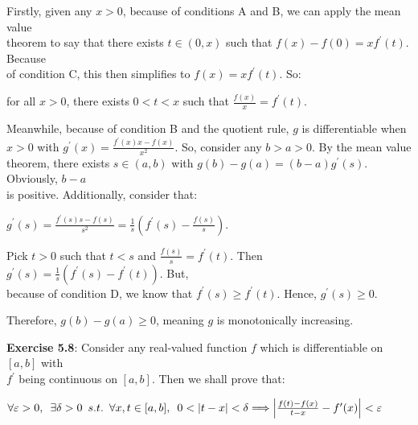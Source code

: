 \documentclass{book}
\newcommand{\pracTwo}{
   \color{Orange}%
   \fontsize{12}{14}\selectfont%
}
\newenvironment{myIndent}{%
   \begin{adjustwidth}{2.5em}{0em}%
}{%
   \end{adjustwidth}%
}
\newcommand{\suchthat}{ \hspace{0.5em}s.t.\hspace{0.5em}}
\newcommand{\myHS}{ \hspace{0.5em}}
\newcommand{\retTwo}{\hfill\bigbreak}
\begin{document}
{\begin{myIndent}\pracTwo
   Firstly, given any $x > 0$, because of conditions A and B, we can apply the mean value\\ theorem to say that there exists $t \in (0, x)$ such that $f(x) - f(0) = xf^\prime(t)$. Because\\ of condition C, this then simplifies to $f(x) = xf^\prime(t)$. So:
   \begin{center}
      for all $x > 0$, there exists $0 < t < x$ such that $\frac{f(x)}{x} = f^\prime(t)$.\retTwo
   \end{center}

   Meanwhile, because of condition B and the quotient rule, $g$ is differentiable when\\ $x > 0$ with $g^\prime(x) = \frac{f^\prime(x)x - f(x)}{x^2}$. So, consider any $b > a > 0$. By the mean value\\ theorem, there exists $s \in (a, b)$ with $g(b) - g(a) = (b - a)g^\prime(s)$. Obviously, $b - a$\\ [1pt] is positive. Additionally, consider that:
   
   {\center$g^\prime(s) = \frac{f^\prime(s)s - f(s)}{s^2} = \frac{1}{s}\left(f^\prime(s) - \frac{f(s)}{s}\right)$.\retTwo\par}

   Pick $t > 0$ such that $t < s$ and $\frac{f(s)}{s} = f^\prime(t)$. Then $g^\prime(s) = \frac{1}{s}\left(f^\prime(s) - f^\prime(t)\right)$. But,\\ because of condition D, we know that $f^\prime(s) \geq f^\prime(t)$. Hence, $g^\prime(s) \geq 0$.\retTwo

   Therefore, $g(b) - g(a) \geq 0$, meaning $g$ is monotonically increasing.
\end{myIndent}}

\newpage

\textbf{Exercise 5.8}: Consider any real-valued function $f$ which is differentiable on $[a, b]$ with\\ $f^\prime$ being continuous on $[a, b]$. Then we shall prove that:

{\centering $\forall \varepsilon > 0,\myHS \exists \delta > 0\suchthat\forall x, t \in [a, b],\myHS 0 < |t - x| < \delta \Longrightarrow \left|\frac{f(t) - f(x)}{t - x} - f^\prime(x)\right| < \varepsilon$ \retTwo\par}
\end{document}
